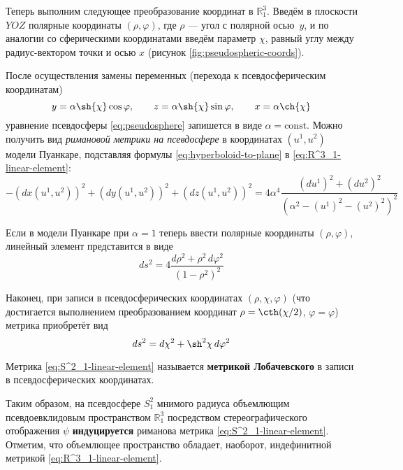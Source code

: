 \documentclass{article}
\numberwithin{equation}{section}
\renewcommand{\phi}{\varphi}
\newcommand{\neword}[1]{\textbf{#1}}
\begin{document}


Теперь выполним следующее преобразование координат в $\mathbb{R}^3_1$.
Введём в плоскости $YOZ$ полярные координаты $(\rho, \phi)$, где
$\rho$ — угол с полярной осью $y$, и по аналогии со сферическими
координатами введём параметр $\chi$, равный углу между радиус-вектором
точки и осью $x$ (рисунок \ref{fig:pseudospheric-coords}).



После осуществления замены переменных (перехода к псевдосферическим
координатам)
\begin{equation*}\label{eq:pseudospheric-coords}
  y = \alpha \sh{\chi} \cos{\phi}, \qquad
  z = \alpha \sh{\chi} \sin{\phi}, \qquad
  x = \alpha \ch{\chi}
\end{equation*}
уравнение псевдосферы \eqref{eq:pseudosphere} запишется в виде $\alpha
= \text{const}$. Можно получить вид \emph{римановой метрики на
  псевдосфере} в координатах $(u^1, u^2)$ модели Пуанкаре, подставляя
формулы \eqref{eq:hyperboloid-to-plane} в
\eqref{eq:R^3_1-linear-element}:
\begin{equation*}
  -(dx(u^1, u^2))^2 + (dy(u^1, u^2))^2 + (dz(u^1, u^2))^2 =
  4\alpha^4\frac{(du^1)^2 + (du^2)^2}
                {\left (\alpha^2 - (u^1)^2-(u^2)^2 \right )^2}
\end{equation*}

Если в модели Пуанкаре при $\alpha=1$ теперь ввести полярные
координаты $(\rho, \phi)$, линейный элемент представится в виде
\begin{equation}\label{eq:poincare-lin-elt-polar}
  ds^2 = 4\frac{d\rho^2 + \rho^2\,d\phi^2}{\left (1 - \rho^2 \right )^2}
\end{equation}

Наконец, при записи в псевдосферических координатах $(\rho, \chi, \phi)$
(что достигается выполнением преобразованием координат $\rho =
\cth(\chi/2)$, $\phi=\phi$) метрика приобретёт вид
\begin{equation}\label{eq:S^2_1-linear-element}
  ds^2 = d\chi^2 + \sh^2{\chi}\,d\phi^2
\end{equation}

Метрика \eqref{eq:S^2_1-linear-element} называется \neword{метрикой
  Лобачевского} в записи в псевдосферических координатах.

Таким образом, на псевдосфере $S^2_1$ мнимого радиуса объемлющим
псевдоевклидовым пространством $\mathbb{R}^3_1$ посредством
стереографического отображения $\psi$ \neword{индуцируется} риманова
метрика \eqref{eq:S^2_1-linear-element}. Отметим, что объемлющее
пространство обладает, наоборот, индефинитной метрикой
\eqref{eq:R^3_1-linear-element}.
\end{document}
